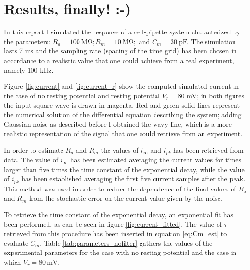 \documentclass[a4paper]{article}
\begin{document}
\section{Results, finally! :-)}

In this report I simulated the response of a cell-pipette system characterized by the parameters: $R_a = 100\ \si{\mega\ohm}; R_m = 10 \ \si{\mega\ohm};$ and $C_m=30\ \si{\pico\farad}.$
The simulation lasts 7 ms and the sampling rate (spacing of the time grid) has been chosen in accordance to a realistic value that one could achieve from a real experiment, namely 100 kHz.

Figure \ref{fig:current} and \ref{fig:current_r} show the computed simulated current in the case of no resting potential and resting potential $V_r = 80$ mV; in both figures the input square wave is drawn in magenta.
Red and green solid lines represent the numerical solution of the differential equation describing the system; adding Gaussian noise as described before I obtained the wavy line, which is a more realistic representation of the signal that one could retrieve from an experiment.

\noindent In order to estimate $R_a$ and $R_m$ the values of $i_\infty$ and $i_{pk}$ has been retrieved from data.
The value of $i_\infty$ has been estimated averaging the current values for times larger than five times the time constant of the exponential decay, while the value of $i_{pk}$ has been established averaging the first five current samples after the peak.
This method was used in order to reduce the dependence of the final values of $R_a$ and $R_m$ from the stochastic error on the current value given by the noise.

\noindent To retrieve the time constant of the exponential decay, an exponential fit has been performed, as can be seen in figure \ref{fig:current_fitted}.
The value of $\tau$ retrieved from this procedure has been inserted in equation \eqref{eq:Cm_est} to evaluate $C_m.$
\noindent Table \ref{tab:parameters_nofilter} gathers the values of the experimental parameters for the case with no resting potential and the case in which $V_r = 80 \ \si{\mV}.$ 
\end{document}
